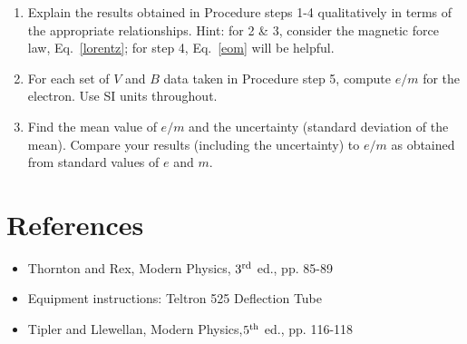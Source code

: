 \begin{enumerate}
\item Explain the results obtained in Procedure steps 1-4 qualitatively
in terms of the appropriate relationships. Hint: for 2 \& 3, consider
the magnetic force law, Eq.~\ref{lorentz}; for step 4, Eq.~\ref{eom} will be helpful.

\item For each set of $V$ and $B$ data taken in Procedure step 5, compute $e/m$
for the electron. Use SI units throughout.

\item Find the mean value of $e/m$ and the uncertainty (standard deviation of
the mean). Compare your results (including the uncertainty) to
$e/m$ as obtained from standard values of $e$ and $m$.
\end{enumerate}

\section{References}
\begin{itemize}
\item Thornton and Rex, Modern Physics, $3^{\rm rd}$ ed., pp. 85-89
\item Equipment instructions: Teltron 525 Deflection Tube
\item Tipler and Llewellan, Modern Physics,$5^{\rm th}$ ed., pp. 116-118
\end{itemize}

